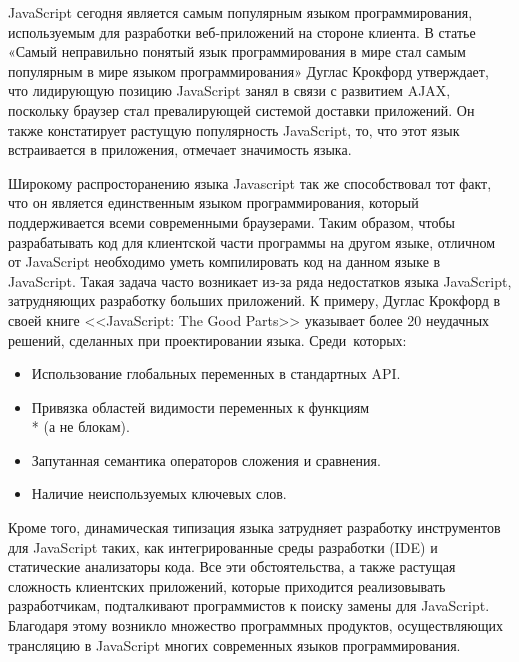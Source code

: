 \startprefacepage


JavaScript сегодня является самым популярным языком программирования, используемым для разработки веб-приложений на стороне клиента\cite{JsUsage, LangUsage}. В статье «Самый неправильно понятый язык программирования в мире стал самым популярным в мире языком программирования»\cite{MostPopLang} Дуглас Крокфорд утверждает, что лидирующую позицию JavaScript занял в связи с развитием AJAX, поскольку браузер стал превалирующей системой доставки приложений. Он также констатирует растущую популярность JavaScript, то, что этот язык встраивается в приложения, отмечает значимость языка.

Широкому распросторанению языка Javascript так же способствовал тот факт, что он является единственным языком программирования, который поддерживается всеми современными браузерами. Таким образом, чтобы разрабатывать код для клиентской части программы на другом языке, отличном от JavaScript необходимо уметь компилировать код на данном языке  в JavaScript. Такая задача часто возникает из-за ряда недостатков языка JavaScript, затрудняющих разработку больших приложений.
К примеру, Дуглас Крокфорд в своей книге <<JavaScript: The Good Parts>>\cite{GoodParts} указывает более 20 неудачных решений, сделанных при проектировании языка. Среди~которых:
\begin{itemize}
\item Использование глобальных переменных в стандартных API.
\item Привязка областей видимости переменных к функциям\\* (а не блокам).
\item Запутанная семантика операторов сложения и сравнения.
\item Наличие неиспользуемых ключевых слов.
\end{itemize} 

Кроме того, динамическая типизация языка затрудняет разработку инструментов для JavaScript таких, как интегрированные среды разработки (IDE) и статические анализаторы кода. Все эти обстоятельства, а также растущая сложность клиентских приложений, которые приходится реализовывать разработчикам, подталкивают программистов к поиску замены для JavaScript. Благодаря этому возникло множество программных продуктов, осуществляющих трансляцию в JavaScript многих современных языков программирования.\cite{AltJS}

